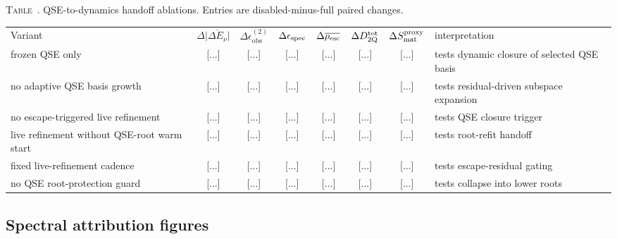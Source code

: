 \documentclass[
  reprint,
  amsmath,
  amssymb,
  aps,
  pra,
  nofootinbib,
  superscriptaddress,
  floatfix
]{revtex4-2}
\newcommand{\placeholder}[1]{\textcolor{red!70!black}{\ifmmode\left[#1\right]\else\textsf{[#1]}\fi}}
\newcommand{\obs}{\mathrm{obs}}
\newcommand{\twq}{\mathrm{2Q}}
\newcommand{\inlinetablecaption}[2]{%
  \refstepcounter{table}\label{#1}%
  \noindent\textsc{Table~\thetable.} #2\par\vspace{0.6ex}%
}
\begin{document}
\begin{widetext}
\inlinetablecaption{tab:excited_dyn_ablation_matrix}{QSE-to-dynamics handoff ablations. Entries are disabled-minus-full paired changes.}
\begin{center}
\scriptsize
\begin{ruledtabular}
\begin{tabular*}{\textwidth}{@{\extracolsep{\fill}}p{}ccccccp{}@{}}
Variant & $\Delta\overline{|\Delta E_\nu|}$ & $\Delta\epsilon_{\obs}^{(2)}$ & $\Delta\epsilon_{\rm spec}$ & $\Delta\overline{\rho_{\rm esc}}$ & $\Delta D_{\twq}^{\rm tot}$ & $\Delta S_{\rm mat}^{\rm proxy}$ & interpretation \\
\colrule
frozen QSE only & \placeholder{...} & \placeholder{...} & \placeholder{...} & \placeholder{...} & \placeholder{...} & \placeholder{...} & tests dynamic closure of selected QSE basis\\
no adaptive QSE basis growth & \placeholder{...} & \placeholder{...} & \placeholder{...} & \placeholder{...} & \placeholder{...} & \placeholder{...} & tests residual-driven subspace expansion\\
no escape-triggered live refinement & \placeholder{...} & \placeholder{...} & \placeholder{...} & \placeholder{...} & \placeholder{...} & \placeholder{...} & tests QSE closure trigger\\
live refinement without QSE-root warm start & \placeholder{...} & \placeholder{...} & \placeholder{...} & \placeholder{...} & \placeholder{...} & \placeholder{...} & tests root-refit handoff\xed live-refinement cadence & \placeholder{...} & \placeholder{...} & \placeholder{...} & \placeholder{...} & \placeholder{...} & \placeholder{...} & tests escape-residual gating\\
no QSE root-protection guard & \placeholder{...} & \placeholder{...} & \placeholder{...} & \placeholder{...} & \placeholder{...} & \placeholder{...} & tests collapse into lower roots\\
\end{tabular*}
\end{ruledtabular}
\end{center}
\end{widetext}
\fi

\subsection{Spectral attribution figures}
\end{document}
